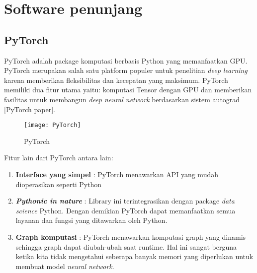 \documentclass[../thesis.tex]{subfiles}
\begin{document}
\section{Software penunjang}
\subsection{PyTorch}
PyTorch adalah package komputasi berbasis Python yang memanfaatkan GPU. PyTorch merupakan salah satu platform populer untuk penelitian \textit{deep learning} karena memberikan fleksibilitas dan kecepatan yang maksimum.
PyTorch memiliki dua fitur utama yaitu: komputasi Tensor dengan GPU dan memberikan fasilitas untuk membangun \textit{deep neural network} berdasarkan sistem autograd [PyTorch paper]. 
\begin{figure}[htp]
	\centering
	\texttt{[image: PyTorch]}
	\caption{PyTorch}
	\label{PyTorch}
\end{figure}


Fitur lain dari PyTorch antara lain:
\begin{enumerate}
	\item \textbf{Interface yang simpel} : PyTorch menawarkan API yang mudah dioperasikan seperti Python
	\item \textbf{\textit{Pythonic in nature}} : Library ini terintegrasikan dengan package \textit{data science} Python. Dengan demikian PyTorch dapat memanfaatkan semua layanan dan fungsi yang ditawarkan oleh Python.
	\item \textbf{Graph komputasi} : PyTorch menawarkan komputasi graph yang dinamis sehingga graph dapat diubah-ubah saat runtime. Hal ini sangat berguna ketika kita tidak mengetahui seberapa banyak memori yang diperlukan untuk membuat model \textit{neural network}.
\end{enumerate}
\end{document}
